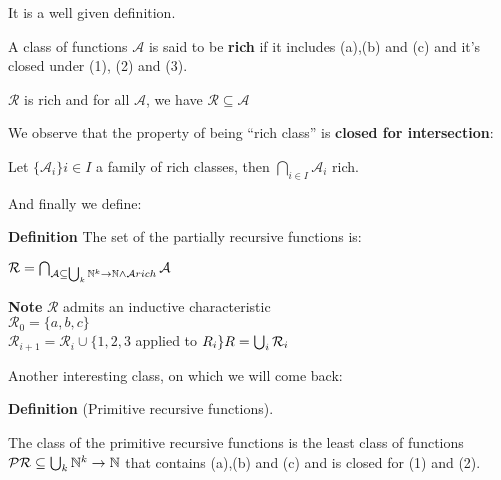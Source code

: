 It is a well given definition.

\begin{definition}
    A class of functions $\mathcal{A}$ is said to be \textbf{rich} if it includes (a),(b) and (c) and it's closed under (1), (2) and (3).
\end{definition}

$\mathcal{R}$ is rich and for all $\mathcal{A}$, we have $\mathcal{R}\subseteq\mathcal{A}$

We observe that the property of being ``rich class'' is \textbf{closed for intersection}:

Let $\{\mathcal{A}_i\}i\in I$ a family of rich classes, then $\bigcap_{i\in I}\mathcal{A}_i$ rich.

And finally we define:

\textbf{Definition} The set of the partially recursive functions is:

$\mathcal{R} = \bigcap_{\mathcal{A} \subseteq \bigcup_k \mathbb{N}^k\rightarrow\mathbb{N}
  \land
  \mathcal{A}rich} \mathcal{A}$

\textbf{Note} $\mathcal{R}$ admits an inductive characteristic\\
$\mathcal{R}_0 = \{a,b,c\}$\\
$\mathcal{R}_{i+1} = \mathcal{R}_i \cup \{1,2,3 $ applied to $ R_i\}\\
R = \bigcup_i \mathcal{R}_i$

Another interesting class, on which we will come back:

\textbf{Definition} (Primitive recursive functions).

The class of the primitive recursive functions is the least class of functions $\mathcal{PR}\subseteq \bigcup_k\mathbb{N}^k\rightarrow\mathbb{N}$ that contains (a),(b) and (c) and is closed for (1) and (2).

